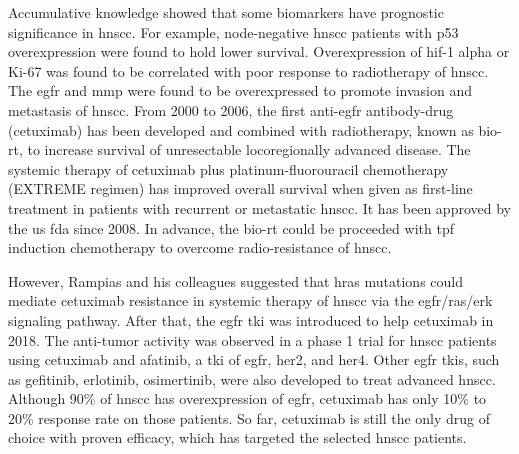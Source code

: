 \documentclass[jpm,article,submit,moreauthors,pdftex]{Definitions/mdpi}
\begin{document}
Accumulative knowledge showed that some biomarkers have prognostic significance in \acrshort{hnscc}. For example, node-negative \acrshort{hnscc} patients with p53 overexpression were found to hold lower survival\cite{DeVicente2004}.
Overexpression of \acrfull{hif}-1 alpha\cite{Aebersold2001} or Ki-67\cite{Couture2002} was found to be correlated with poor response to radiotherapy of \acrshort{hnscc}. The \acrfull{egfr}\cite{O-Charoenrat2000}\cite{Bentzen2005} and \acrfull{mmp}\cite{Harrington2017} were found to be overexpressed to promote invasion and metastasis of \acrshort{hnscc}.
From 2000 to 2006, the first anti-\acrshort{egfr} antibody-drug (cetuximab) has been developed and combined with radiotherapy, known as bio-\acrshort{rt}, to increase survival of unresectable locoregionally advanced disease\cite{Bonner2006a}.
The systemic therapy of cetuximab plus platinum-fluorouracil chemotherapy (EXTREME regimen) has improved overall survival when given as first-line treatment in patients with recurrent or metastatic \acrshort{hnscc}\cite{Vermorken2008}\cite{Rivera2009}. It has been approved by the \acrshort{us} \acrfull{fda} since 2008. In advance, the bio-\acrshort{rt} could be proceeded with \acrfull{tpf} induction chemotherapy to overcome  radio-resistance of \acrshort{hnscc}\cite{Blanchard2013}.

However, Rampias and his colleagues\cite{Rampias2014} suggested that \acrfull{hras} mutations could mediate cetuximab resistance in systemic therapy of \acrshort{hnscc} via the \acrshort{egfr}/\acrfull{ras}/\acrfull{erk} signaling pathway.
After that, the \acrshort{egfr} \acrfull{tki} was introduced to help cetuximab in 2018. The anti-tumor activity was observed in a phase 1 trial for \acrshort{hnscc} patients using cetuximab and afatinib, a \acrshort{tki} of \acrshort{egfr}, \acrfull{her}2, and \acrshort{her}4\cite{Gazzah2018}. Other \acrshort{egfr} \acrshort{tki}s, such as gefitinib, erlotinib, osimertinib, were also developed to treat advanced \acrshort{hnscc}.
Although 90\% of \acrshort{hnscc} has overexpression of \acrshort{egfr}, cetuximab has only 10\% to 20\% response rate on those patients. So far, cetuximab is still the only drug of choice with proven efficacy, which has targeted the selected \acrshort{hnscc} patients\cite{Taberna2019}.
\end{document}
